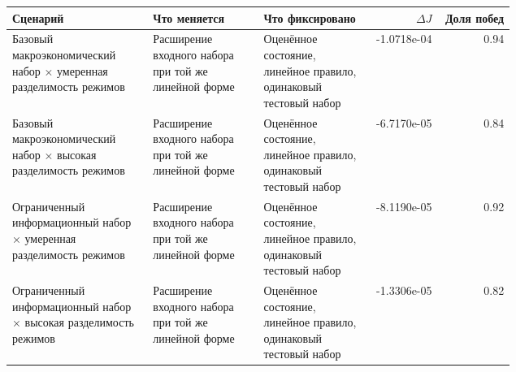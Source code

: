 \begin{tabular}{p{0.28\linewidth}p{0.22\linewidth}p{0.22\linewidth}rr}
\toprule
Сценарий & Что меняется & Что фиксировано & $\Delta J$ & Доля побед \\
\midrule
Базовый макроэкономический набор × умеренная разделимость режимов & Расширение входного набора при той же линейной форме & Оценённое состояние, линейное правило, одинаковый тестовый набор & -1.0718e-04 & 0.94 \\
Базовый макроэкономический набор × высокая разделимость режимов & Расширение входного набора при той же линейной форме & Оценённое состояние, линейное правило, одинаковый тестовый набор & -6.7170e-05 & 0.84 \\
Ограниченный информационный набор × умеренная разделимость режимов & Расширение входного набора при той же линейной форме & Оценённое состояние, линейное правило, одинаковый тестовый набор & -8.1190e-05 & 0.92 \\
Ограниченный информационный набор × высокая разделимость режимов & Расширение входного набора при той же линейной форме & Оценённое состояние, линейное правило, одинаковый тестовый набор & -1.3306e-05 & 0.82 \\
\bottomrule
\end{tabular}